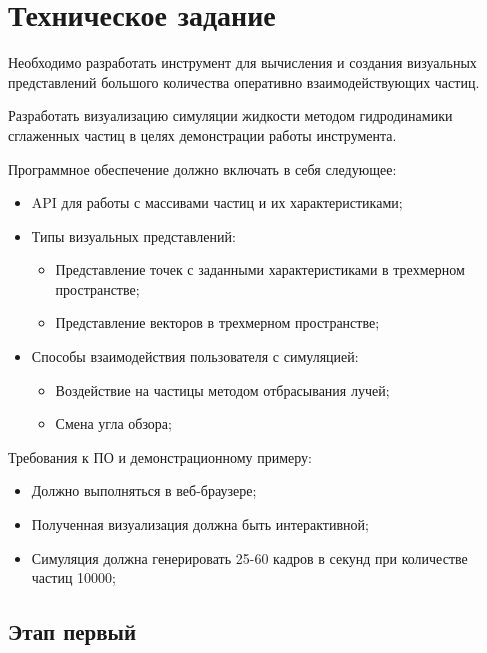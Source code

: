 \newpage
\section{Техническое задание}

Необходимо разработать инструмент для вычисления и создания визуальных 
представлений большого количества оперативно взаимодействующих частиц.

Разработать визуализацию симуляции жидкости методом гидродинамики сглаженных
частиц в целях демонстрации работы инструмента.

Программное обеспечение должно включать в себя следующее:

\begin{itemize}
  \item API для работы с массивами частиц и их характеристиками;
  \item Типы визуальных представлений:
    \begin{itemize}
      \item Представление точек с заданными характеристиками в трехмерном пространстве;
      \item Представление векторов в трехмерном пространстве;
    \end{itemize}
  \item Способы взаимодействия пользователя с симуляцией:
    \begin{itemize}
      \item Воздействие на частицы методом отбрасывания лучей;
      \item Смена угла обзора;
    \end{itemize}
\end{itemize}

Требования к ПО и демонстрационному примеру:

\begin{itemize}
  \item Должно выполняться в веб-браузере;
  \item Полученная визуализация должна быть интерактивной;
  \item Симуляция должна генерировать 25-60 кадров в секунд 
    при количестве частиц 10000;
\end{itemize}

\subsection{Этап первый}

